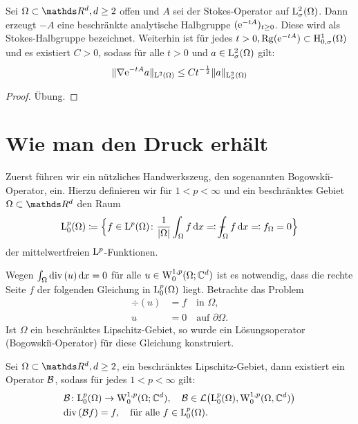 \begin{thm}
  Sei $\Omega \subset \R^d, d \geq 2$ offen und $A$ sei der Stokes-Operator auf $\mathrm{L}^2_\sigma(\Omega)$.
  Dann erzeugt $-A$ eine beschränkte analytische Halbgruppe $(\mathrm{e}^{-tA})_{t \geq 0}$.
  Diese wird als Stokes-Halbgruppe bezeichnet.
  Weiterhin ist für jedes $t > 0, \operatorname{Rg}(\mathrm{e}^{-tA}) \subset \mathrm{H}_{0,\sigma}^1(\Omega)$ und es existiert $C > 0$, sodass für alle $t > 0$ und $a \in \mathrm{L}_\sigma^2(\Omega)$ gilt:
  $$
  \|\nabla \mathrm{e}^{-tA} a \|_{\mathrm{L}^2(\Omega)} \leq C t^{-\frac{1}{2}} \|a\|_{\mathrm{L}_\sigma^2(\Omega)}
  $$
\end{thm}

\begin{proof}
  Übung.
\end{proof}

\section{Wie man den Druck erhält}

Zuerst führen wir ein nützliches Handwerkszeug, den sogenannten Bogowski\u{\i}-Operator, ein.
Hierzu definieren wir für $1 < p < \infty$ und ein beschränktes Gebiet $\Omega \subset \R^d$ den Raum
$$
\Ell^p_0(\Omega) \coloneqq \Big\{ f \in \Ell^p(\Omega) \colon \frac{1}{|\Omega|} \int_\Omega f \d x \eqqcolon \dashint_\Omega f \d x \eqqcolon f_\Omega = 0 \Big\}
$$
der mittelwertfreien $\mathrm{L}^p$-Funktionen.

Wegen $\int_\Omega \mathrm{div\,} (u) \, {\operatorname{d}\!{x}} = 0$ für alle $u \in \mathrm{W}_0^{1,p}(\Omega; \mathbb{C}^d)$ ist es notwendig, dass die rechte Seite $f$ der folgenden Gleichung in $\mathrm{L}^p_0(\Omega)$ liegt.
Betrachte das Problem
\begin{align*}
  \div(u) &= f \quad\text{in } \Omega, \\
  u &= 0 \quad\text{auf } \partial \Omega.
\end{align*}
Ist $\Omega$ ein beschränktes Lipschitz-Gebiet, so wurde ein Lösungsoperator (Bogowski\u{\i}-Operator) für diese Gleichung konstruiert.

\begin{thm}
  \label{thm:bogowskii}
  Sei $\Omega \subset \R^d, d \geq 2$, ein beschränktes Lipschitz-Gebiet, dann existiert ein Operator $\mathcal{B}$, sodass für jedes $1 < p < \infty$ gilt:
  \begin{align*}
    &\mathcal{B} \colon \mathrm{L}_0^p(\Omega) \to \mathrm{W}_0^{1,p}(\Omega; \mathbb{C}^d), \quad \mathcal{B} \in \mathcal{L}\big(\mathrm{L}_0^p(\Omega), \mathrm{W}_0^{1,p}(\Omega, \mathbb{C}^d)\big) \\
    &\mathrm{div\,} (\mathcal{B} f) = f, \quad\text{für alle } f \in \mathrm{L}_0^p(\Omega).
  \end{align*}
\end{thm}

